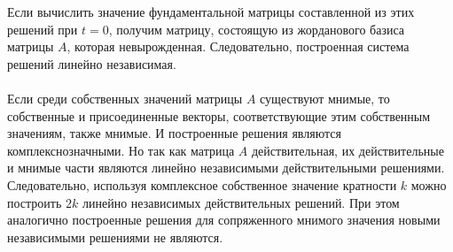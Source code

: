 \documentclass[a4paper, 12pt]{report}
\begin{document}
Если вычислить значение фундаментальной матрицы составленной из этих решений при $t=0$, получим матрицу, состоящую из жорданового базиса матрицы $A$, которая невырожденная. Следовательно, построенная система решений линейно независимая.\\\\
Если среди собственных значений матрицы $A$ существуют мнимые, то собственные и присоединенные векторы, соответствующие этим собственным значениям, также мнимые. И построенные решения являются комплекснозначными. Но так как матрица $A$ действительная, их действительные и мнимые части являются линейно независимыми действительными решениями. Следовательно, используя комплексное собственное значение кратности $k$ можно построить $2k$ линейно независимых действительных решений. При этом аналогично построенные решения для сопряженного мнимого значения новыми независимыми решениями не являются. 
\end{document}
